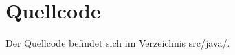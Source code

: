 \chapter{Quellcode}\label{ch:quellcode}
Der Quellcode befindet sich im Verzeichnis \glqq src/java/\grqq{}.